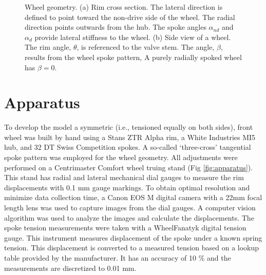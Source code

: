 \documentclass[journal]{IEEEtran}
\begin{document}
\begin{figure}[!t]
\centering
    \caption{Wheel geometry. (a)  Rim cross section.  The lateral direction is defined to point toward the non-drive side of the wheel.  The radial direction points outwards from the hub.  The spoke angles $\alpha_{{nd}}$ and $\alpha_{{d}}$ provide lateral stiffness to the wheel. (b) Side view of a wheel. The rim angle, $\theta$, is referenced to the valve stem.  The angle, $\beta$, results from the wheel spoke pattern,  A purely radially spoked wheel has $\beta = 0$.}
    \label{geom}
    \end{figure}

\section{Apparatus}
To develop the model a symmetric (i.e., tensioned equally on both sides), front wheel was built by hand using a Stans ZTR Alpha rim, a White Industries MI5 hub, and 32 DT Swiss Competition spokes.  A so-called `three-cross' tangential spoke pattern was employed for the wheel geometry.  All adjustments were performed on a Centrimaster Comfort wheel truing stand (Fig \ref{fig:apparatus}).  This stand has radial and lateral mechanical dial gauges to measure the rim displacements with 0.1 mm gauge markings. To obtain optimal resolution and minimize data collection time, a Canon EOS M digital camera with a 22mm focal length lens was used to capture images from the dial gauges.  A computer vision algorithm was used to analyze the images and calculate the displacements.  The spoke tension measurements were taken with a  WheelFanatyk digital tension gauge. This instrument measures displacement of the spoke under a known spring tension. This displacement is converted to a measured tension based on a lookup table provided by the manufacturer. It has an accuracy of 10 \% and the measurements are discretized to 0.01 mm.
\end{document}
